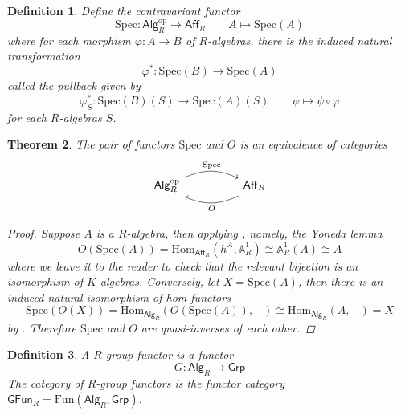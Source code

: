 \documentclass[10pt]{book}
\theoremstyle{bookplain}
\newtheorem{theorem}{Theorem}[section]
\theoremstyle{bookdefinition}
\newtheorem{definition}[theorem]{Definition}
\theoremstyle{bookremark}
\begin{document}
\begin{definition}
Define the contravariant functor \[\mathrm{Spec}:\mathsf{Alg}_R^{\mathrm{op}}\rightarrow \mathsf{Aff}_R\qquad A\mapsto \mathrm{Spec}(A)\]
    where for each morphism $\varphi:A\rightarrow B$ of $R$-algebras, there is the induced natural transformation \[\varphi^*:\mathrm{Spec}(B)\rightarrow\mathrm{Spec}(A)\] called the \textit{pullback} given by 
    \[\varphi^*_S:\mathrm{Spec}(B)(S)\rightarrow \mathrm{Spec}(A)(S)\qquad \psi\mapsto \psi\circ\varphi\]
    for each $R$-algebras $S$. 
\end{definition}

\begin{theorem}The pair of functors $\mathrm{Spec}$ and $O$ is an equivalence of categories
\[\begin{tikzcd}
	{\mathsf{Alg}_R^{\mathrm{op}}} && {\mathsf{Aff}_R}
	\arrow["{\mathrm{Spec}}", bend left = 25, from=1-1, to=1-3]
	\arrow["{O}", shift left=1, bend left = 25, from=1-3, to=1-1]
\end{tikzcd}\]
\begin{proof}Suppose $A$ is a $R$-algebra, then applying , namely, the Yoneda lemma
    \[O(\mathrm{Spec}(A))=\mathrm{Hom}_{\mathsf{Aff}_R}(h^{A},\mathbb{A}^1_R)\cong \mathbb{A}^1_R(A)\cong A\]
    where we leave it to the reader to check that the relevant bijection is an isomorphism of $K$-algebras. Conversely, let $X=\mathrm{Spec}(A)$, then there is an induced natural isomorphism of hom-functors
    \[\mathrm{Spec}(O(X))=\mathrm{Hom}_{\mathsf{Alg}_R}(O(\mathrm{Spec}(A)),-)\cong \mathrm{Hom}_{\mathsf{Alg}_R}(A,-)=X\]
    by . Therefore $\mathrm{Spec}$ and $O$ are quasi-inverses of each other. 
\end{proof}
\end{theorem}
\begin{definition}A \textit{$R$-group functor} is a functor \[G:\mathsf{Alg}_R\rightarrow\mathsf{Grp}\] 
    The \textit{category of $R$-group functors} is the functor category $\mathsf{GFun}_R=\mathrm{Fun}(\mathsf{Alg}_R,\mathsf{Grp})$.
\end{definition}
\end{document}
